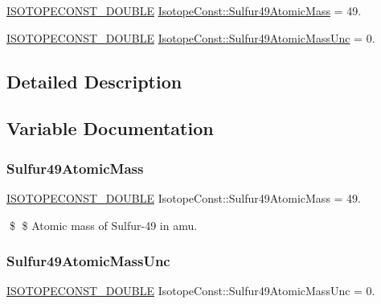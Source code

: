 \begin{DoxyCompactItemize}
\item 
\mbox{\hyperlink{group___isotope_const-_macros_ga8f45a7272ce02c0b4c65c44636ed719a}{I\+S\+O\+T\+O\+P\+E\+C\+O\+N\+S\+T\+\_\+\+D\+O\+U\+B\+LE}} \mbox{\hyperlink{group___isotope_const-_sulfur-_s49_ga50c6b04578a691ef99111d4ad103df1d}{Isotope\+Const\+::\+Sulfur49\+Atomic\+Mass}} = 49.
\item 
\mbox{\hyperlink{group___isotope_const-_macros_ga8f45a7272ce02c0b4c65c44636ed719a}{I\+S\+O\+T\+O\+P\+E\+C\+O\+N\+S\+T\+\_\+\+D\+O\+U\+B\+LE}} \mbox{\hyperlink{group___isotope_const-_sulfur-_s49_ga06ca9f21357716446bbdd57be01960f0}{Isotope\+Const\+::\+Sulfur49\+Atomic\+Mass\+Unc}} = 0.
\end{DoxyCompactItemize}


\subsection{Detailed Description}


\subsection{Variable Documentation}
\mbox{\label{group___isotope_const-_sulfur-_s49_ga50c6b04578a691ef99111d4ad103df1d}} 
\subsubsection{\texorpdfstring{Sulfur49\+Atomic\+Mass}{Sulfur49AtomicMass}}
{\footnotesize\ttfamily \mbox{\hyperlink{group___isotope_const-_macros_ga8f45a7272ce02c0b4c65c44636ed719a}{I\+S\+O\+T\+O\+P\+E\+C\+O\+N\+S\+T\+\_\+\+D\+O\+U\+B\+LE}} Isotope\+Const\+::\+Sulfur49\+Atomic\+Mass = 49.}

\$ \$ Atomic mass of Sulfur-\/49 in amu. \mbox{\label{group___isotope_const-_sulfur-_s49_ga06ca9f21357716446bbdd57be01960f0}} 
\subsubsection{\texorpdfstring{Sulfur49\+Atomic\+Mass\+Unc}{Sulfur49AtomicMassUnc}}
{\footnotesize\ttfamily \mbox{\hyperlink{group___isotope_const-_macros_ga8f45a7272ce02c0b4c65c44636ed719a}{I\+S\+O\+T\+O\+P\+E\+C\+O\+N\+S\+T\+\_\+\+D\+O\+U\+B\+LE}} Isotope\+Const\+::\+Sulfur49\+Atomic\+Mass\+Unc = 0.}

